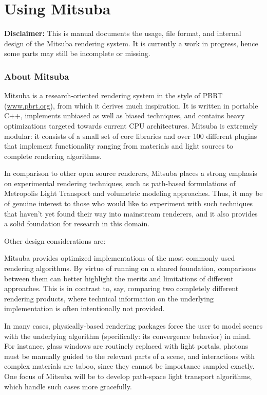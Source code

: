 \part{Using Mitsuba}
\textbf{Disclaimer:} This is manual documents the usage, file format, and
internal design of the Mitsuba rendering system. It is currently a work
in progress, hence some parts may still be incomplete or missing.

\section{About Mitsuba}
Mitsuba is a research-oriented rendering system in the style of PBRT
(\url{www.pbrt.org}), from which it derives much inspiration.
It is written in portable C++, implements unbiased as well
as biased techniques, and contains heavy optimizations targeted
towards current CPU architectures.
Mitsuba is extremely modular: it consists of a small set of core libraries
and over 100 different plugins that implement functionality ranging
from materials and light sources to complete rendering algorithms.

In comparison to other open source renderers, Mitsuba places a strong
emphasis on experimental rendering techniques, such as path-based
formulations of Metropolis Light Transport and volumetric
modeling approaches. Thus, it may be of genuine interest to those who
would like to experiment with such techniques that haven't yet found
their way into mainstream renderers, and it also provides a solid
foundation for research in this domain.

Other design considerations are:

Mitsuba provides optimized implementations of the most commonly
used rendering algorithms. By virtue of running on a shared foundation, comparisons between them can
better highlight the merits and limitations of different approaches. This is in contrast to, say,
comparing two completely different rendering products, where technical information on the underlying
implementation is often intentionally not provided.

In many cases, physically-based rendering packages force the user to model scenes with the underlying
algorithm (specifically: its convergence behavior) in mind. For instance, glass windows are routinely
replaced with light portals, photons must be manually guided to the relevant parts of a scene, and
interactions with complex materials are taboo, since they cannot be importance sampled exactly.
One focus of Mitsuba will be to develop path-space light transport algorithms, which handle such
cases more gracefully.


